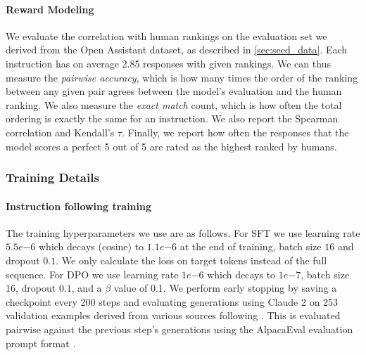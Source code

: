 \documentclass{article}
\begin{document}
\paragraph{Reward Modeling}
We evaluate the correlation with human rankings on the evaluation set we derived from the Open Assistant dataset,  as described in \autoref{sec:seed_data}.
Each instruction has on average 2.85 responses with given rankings. 
We can thus measure the {\em pairwise accuracy}, which is how many times the order of the ranking between any given pair agrees between the model's evaluation and the human ranking.
We also measure the {\em exact match} count, which is how often the total ordering is exactly the same for an instruction. We also report the Spearman correlation and Kendall's $\tau$. 
Finally, we report how often the responses that the model scores a perfect 5 out of 5 are rated as the highest ranked by humans.

\subsubsection{Training Details}

\paragraph{Instruction following training}
The training hyperparameters we use are as follows.
For SFT we use learning rate $5.5e{-6}$ which decays (cosine) to $1.1e{-6}$ at the end of training, batch size $16$ and dropout $0.1$. We only calculate the loss on target tokens instead of the full sequence.
For DPO we use learning rate $1e{-6}$ which decays to $1e{-7}$, batch size $16$, dropout $0.1$, and a $\beta$ value of 0.1.
We perform early stopping by saving a checkpoint every 200 steps and evaluating generations using Claude 2 \citep{claude2} on 253 validation examples derived from various sources following \citet{li2023self}. This is evaluated pairwise against the previous step's generations using the AlpacaEval evaluation prompt format \citep{alpaca_eval}.
\end{document}
